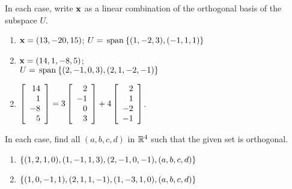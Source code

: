 \begin{multicols}{2}
\begin{ex}
\begin{sol}
\begin{enumerate}[label={\alph*.}]
\end{enumerate}
\end{sol}
\end{ex}

\begin{ex}
In each case, write $\textbf{x}$ as a linear combination of the orthogonal basis of the subspace $U$.

\begin{enumerate}[label={\alph*.}]
\item $\textbf{x} = (13, -20, 15)$; $U = \thinspace\operatorname{span\medspace}\{(1, -2, 3), (-1, 1, 1)\}$

\item $\textbf{x} = (14, 1, -8, 5)$; \\ $U = \thinspace\operatorname{span\medspace}\{(2, -1, 0, 3), (2, 1, -2, -1)\}$

\end{enumerate}
\begin{sol}
\begin{enumerate}[label={\alph*.}]
\setcounter{enumi}{1}
\item  
$\left[ \begin{array}{r}
14\\
1\\
-8\\
5
\end{array} \right] = 3
\left[ \begin{array}{r}
2\\
-1\\
0\\
3
\end{array} \right] + 4
\left[ \begin{array}{r}
2\\
1\\
-2\\
-1
\end{array} \right]$.

\end{enumerate}
\end{sol}
\end{ex}

\begin{ex}
In each case, find all $(a, b, c, d)$ in $\mathbb{R}^4$ such that the given set is orthogonal.

\begin{enumerate}[label={\alph*.}]
\item $\{(1, 2, 1, 0), (1, -1, 1, 3), (2, -1, 0, -1), \\ (a, b, c, d)\}$

\item $\{(1, 0, -1, 1), (2, 1, 1, -1), (1, -3, 1, 0), \\ (a, b, c, d)\}$


\end{enumerate}
\end{ex}
\end{multicols}
